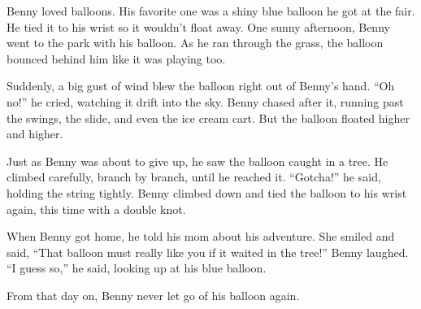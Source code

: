 \documentclass[12pt]{article}
\begin{document}
\begin{tcolorbox}[colframe=black!60, colback=white, 
coltitle=black, colbacktitle=black!15, fonttitle=\bfseries\Large, 
title=Text: The Adventures of Benny and the Blue Balloon, halign title=center, left=10pt, right=10pt, top=10pt, bottom=15pt]
Benny loved balloons. His favorite one was a shiny blue balloon he got at the fair. He tied it to his wrist so it wouldn’t float away. One sunny afternoon, Benny went to the park with his balloon. As he ran through the grass, the balloon bounced behind him like it was playing too.

Suddenly, a big gust of wind blew the balloon right out of Benny’s hand. “Oh no!” he cried, watching it drift into the sky. Benny chased after it, running past the swings, the slide, and even the ice cream cart. But the balloon floated higher and higher.

Just as Benny was about to give up, he saw the balloon caught in a tree. He climbed carefully, branch by branch, until he reached it. “Gotcha!” he said, holding the string tightly. Benny climbed down and tied the balloon to his wrist again, this time with a double knot.

When Benny got home, he told his mom about his adventure. She smiled and said, “That balloon must really like you if it waited in the tree!” Benny laughed. “I guess so,” he said, looking up at his blue balloon.

From that day on, Benny never let go of his balloon again.

 




 

     \end{tcolorbox}
\end{document}
